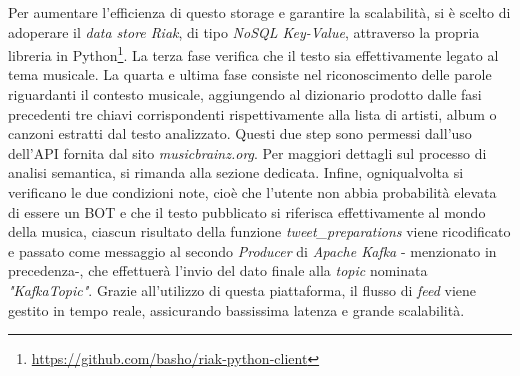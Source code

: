 \documentclass[12pt, a4paper, twocolumn]{article} %
\begin{document}
Per aumentare l'efficienza di questo storage e garantire la scalabilità, si è scelto di adoperare il \textit{data store Riak}, di tipo \textit{NoSQL Key-Value}, attraverso la propria libreria in Python\footnote{\url{https://github.com/basho/riak-python-client}}. 
La terza fase verifica che il testo sia effettivamente legato al tema musicale. 
La quarta e ultima fase consiste nel riconoscimento delle parole riguardanti il contesto musicale, aggiungendo al dizionario prodotto dalle fasi precedenti tre chiavi corrispondenti rispettivamente alla lista di artisti, album o canzoni estratti dal testo analizzato. 
Questi due step sono permessi dall'uso dell'API fornita dal sito \textit{musicbrainz.org}. 
Per maggiori dettagli sul processo di analisi semantica, si rimanda alla sezione dedicata. 
Infine, ogniqualvolta si verificano le due condizioni note, cioè che l'utente non abbia probabilità elevata di essere un BOT e che il testo pubblicato si riferisca effettivamente al mondo della musica, ciascun risultato della funzione \textit{tweet\_preparations} viene ricodificato e passato come messaggio al secondo \textit{Producer} di \textit{Apache Kafka} - menzionato in precedenza-, che effettuerà l'invio del dato finale alla \textit{topic} nominata \textit{"KafkaTopic"}. 
Grazie all'utilizzo di questa piattaforma, il flusso di \textit{feed} viene gestito in tempo reale, assicurando bassissima latenza e grande scalabilità. 
\end{document}
